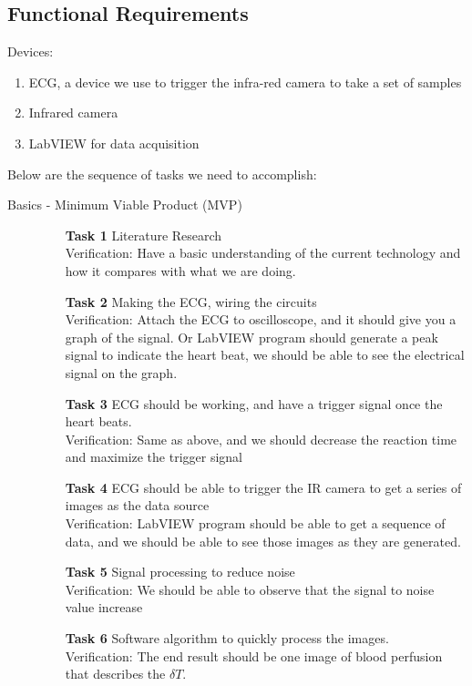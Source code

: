 \documentclass[paper=letter, fontsize=11pt]{scrartcl}
\numberwithin{equation}{section}		%
\numberwithin{figure}{section}			%
\numberwithin{table}{section}			%
\begin{document}
\subsection{Functional Requirements}
Devices: 
\begin{enumerate}{}
	\item ECG, a device we use to trigger the infra-red camera to take a set of samples
	\item Infrared camera
	\item LabVIEW for data acquisition
\end{enumerate}
Below are the sequence of tasks we need to accomplish:
\begin{description}
   \item[Basics - Minimum Viable Product (MVP)] \hspace{1cm}
   	\begin{itemize}
   	\item[\textbf{Task 1}] Literature Research\\
   	\hfill Verification: Have a basic understanding of the current technology and how it compares with what we are doing.
	\item[\textbf{Task 2}] Making the ECG, wiring the circuits\\
	\hfill Verification: Attach the ECG to oscilloscope, and it should give you a graph of the signal. Or LabVIEW program should generate a peak signal to indicate the heart beat, we should be able to see the electrical signal on the graph.
   	\item[\textbf{Task 3}]  ECG should be working, and have a trigger signal once the heart beats.\\
    	\hfill Verification: Same as above, and we should decrease the reaction time and maximize the trigger signal
   	\item[\textbf{Task 4}]  ECG should be able to trigger the IR camera to get a series of images as the data source\\
    	\hfill Verification: LabVIEW program should be able to get a sequence of data, and we should be able to see those images as they are generated.
   	\item[\textbf{Task 5}]  Signal processing to reduce noise\\
   	\hfill Verification: We should be able to observe that the signal to noise value increase
	\item[\textbf{Task 6}] Software algorithm to quickly process the images. \\
   	\hfill Verification: The end result should be one image of blood perfusion that describes the $\delta T$.   
\end{itemize}
  

\end{description}
\end{document}
